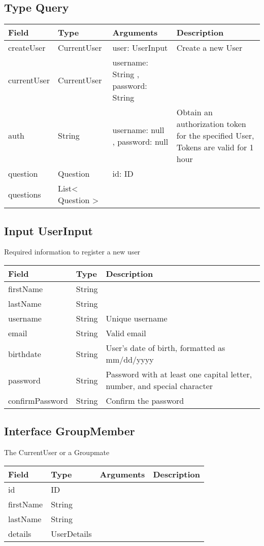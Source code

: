 \hypertarget{type-query}{%
\subsection{Type Query}\label{type-query}}

\begin{longtable}[]{@{}llll@{}}
\toprule
Field & Type & Arguments & Description\tabularnewline
\midrule
\endhead
createUser & CurrentUser & user: UserInput & Create a new
User\tabularnewline
currentUser & CurrentUser & username: String , password: String
&\tabularnewline
auth & String & username: null , password: null & Obtain an
authorization token for the specified User, Tokens are valid for 1
hour\tabularnewline
question & Question & id: ID &\tabularnewline
questions & List\textless{} Question \textgreater{} & &\tabularnewline
\bottomrule
\end{longtable}

\hypertarget{input-userinput}{%
\subsection{Input UserInput}\label{input-userinput}}

Required information to register a new user

\begin{longtable}[]{@{}lll@{}}
\toprule
Field & Type & Description\tabularnewline
\midrule
\endhead
firstName & String &\tabularnewline
lastName & String &\tabularnewline
username & String & Unique username\tabularnewline
email & String & Valid email\tabularnewline
birthdate & String & User's date of birth, formatted as
mm/dd/yyyy\tabularnewline
password & String & Password with at least one capital letter, number,
and special character\tabularnewline
confirmPassword & String & Confirm the password\tabularnewline
\bottomrule
\end{longtable}

\hypertarget{interface-groupmember}{%
\subsection{Interface GroupMember}\label{interface-groupmember}}

The CurrentUser or a Groupmate

\begin{longtable}[]{@{}llll@{}}
\toprule
Field & Type & Arguments & Description\tabularnewline
\midrule
\endhead
id & ID & &\tabularnewline
firstName & String & &\tabularnewline
lastName & String & &\tabularnewline
details & UserDetails & &\tabularnewline
\bottomrule
\end{longtable}

